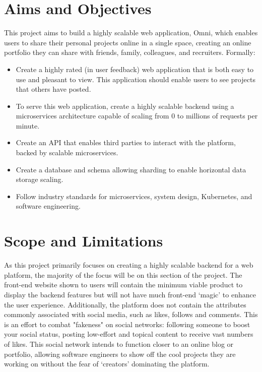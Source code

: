 \section{Aims and Objectives}
\label{sec:intro-aims}
This project aims to build a highly scalable web application, Omni, which enables users to share their personal projects online in a single space, creating an online portfolio they can share with friends, family, colleagues, and recruiters.
Formally:
\begin{itemize}
    \item Create a highly rated (in user feedback) web application that is both easy to use and pleasant to view. This application should enable users to see projects that others have posted.
    \item To serve this web application, create a highly scalable backend using a microservices architecture capable of scaling from 0 to millions of requests per minute.
    \item Create an API that enables third parties to interact with the platform, backed by scalable microservices.
    \item Create a database and schema allowing sharding to enable horizontal data storage scaling.
    \item Follow industry standards for microservices, system design, Kubernetes, and software engineering.
\end{itemize}

\section{Scope and Limitations}
\label{sec:intro-scope}
As this project primarily focuses on creating a highly scalable backend for a web platform, the majority of the focus will be on this section of the project. 
The front-end website shown to users will contain the minimum viable product to display the backend features but will not have much front-end `magic' to enhance the user experience.
Additionally, the platform does not contain the attributes commonly associated with social media, such as likes, follows and comments.
This is an effort to combat "fakeness" on social networks: following someone to boost your social status, posting low-effort and topical content to receive vast numbers of likes.
This social network intends to function closer to an online blog or portfolio, allowing software engineers to show off the cool projects they are working on without the fear of `creators' dominating the platform. 

